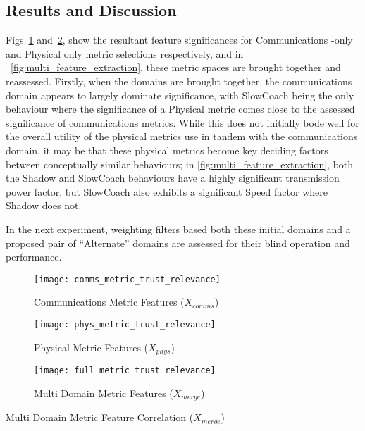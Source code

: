 \subsection{Results and Discussion}

Figs~\ref{fig:comms_feature_extraction} and~\ref{fig:phys_feature_extraction}, show the resultant feature significances for Communications -only and Physical only metric selections respectively, and in ~\autoref{fig:multi_feature_extraction}, these metric spaces are brought together and reassessed.
Firstly, when the domains are brought together, the communications domain appears to largely dominate significance, with SlowCoach being the only behaviour where the significance of a Physical metric comes close to the assessed significance of communications metrics.
While this does not initially bode well for the overall utility of the physical metrics use in tandem with the communications domain, it may be that these physical metrics become key deciding factors between conceptually similar behaviours; in \autoref{fig:multi_feature_extraction}, both the Shadow and SlowCoach behaviours have a highly significant transmission power factor, but SlowCoach also exhibits a significant Speed factor where Shadow does not.

In the next experiment, weighting filters based both these initial domains and a proposed pair of ``Alternate'' domains are assessed for their blind operation and performance.


\begin{figure}[h!]
  \centering
  \texttt{[image: comms\_metric\_trust\_relevance]}
  \caption{Communications Metric Features ($X_{comms}$)}
  \label{fig:comms_feature_extraction}
\end{figure}

\begin{figure}[h!]
  \centering
  \texttt{[image: phys\_metric\_trust\_relevance]}
  \caption{Physical Metric Features ($X_{phys}$)}
  \label{fig:phys_feature_extraction}
\end{figure}

\begin{figure}[h!]
  \centering
  \texttt{[image: full\_metric\_trust\_relevance]}
  \caption{Multi Domain  Metric Features ($X_{merge}$)}
  \label{fig:multi_feature_extraction}
\end{figure}

\begin{table}
  \centering
  \caption{Multi Domain Metric Feature Correlation ($X_{merge}$)}
  
  \label{tab:full_metric_correlations}
\end{table}



